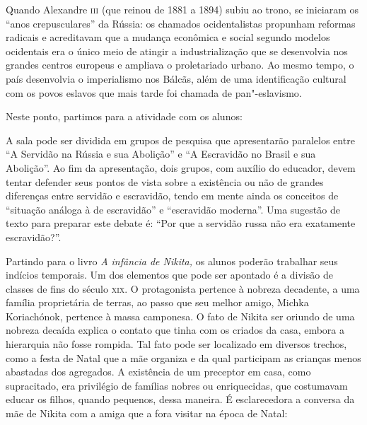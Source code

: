 \documentclass[11pt]{extarticle}
\begin{document}
Quando Alexandre \textsc{iii} (que reinou de 1881 a 1894) subiu ao trono, se
iniciaram os ``anos crepusculares'' da Rússia: os chamados
ocidentalistas propunham reformas radicais e acreditavam que a mudança
econômica e social segundo modelos ocidentais era o único meio de
atingir a industrialização que se desenvolvia nos grandes centros
europeus e ampliava o proletariado urbano. Ao mesmo tempo, o país
desenvolvia o imperialismo nos Bálcãs, além de uma identificação
cultural com os povos eslavos que mais tarde foi chamada de
pan"-eslavismo.


Neste ponto, partimos para a atividade com os alunos:


A sala pode ser dividida em grupos de pesquisa que apresentarão
paralelos entre ``A Servidão na Rússia e sua Abolição'' e ``A Escravidão
no Brasil e sua Abolição''. Ao fim da apresentação, dois grupos, com
auxílio do educador, devem tentar defender seus pontos de vista sobre a
existência ou não de grandes diferenças entre servidão e escravidão,
tendo em mente ainda os conceitos de ``situação análoga à de
escravidão'' e ``escravidão moderna''. Uma sugestão de texto para
preparar este debate é: ``Por que a servidão russa não era exatamente
escravidão?''.


Partindo para o livro \emph{A infância de Nikita,} os alunos poderão
trabalhar seus indícios temporais. Um dos elementos que pode ser
apontado é a divisão de classes de fins do século \textsc{xix}. O protagonista
pertence à nobreza decadente, a uma família proprietária de terras, ao
passo que seu melhor amigo, Michka Koriachónok, pertence à massa
camponesa. O fato de Nikita ser oriundo de uma nobreza decaída explica o
contato que tinha com os criados da casa, embora a hierarquia não fosse
rompida. Tal fato pode ser localizado em diversos trechos, como a festa
de Natal que a mãe organiza e da qual participam as crianças menos
abastadas dos agregados. A existência de um preceptor em casa, como
supracitado, era privilégio de famílias nobres ou enriquecidas, que
costumavam educar os filhos, quando pequenos, dessa maneira. É
esclarecedora a conversa da mãe de Nikita com a amiga que a fora visitar
na época de Natal:
\end{document}
